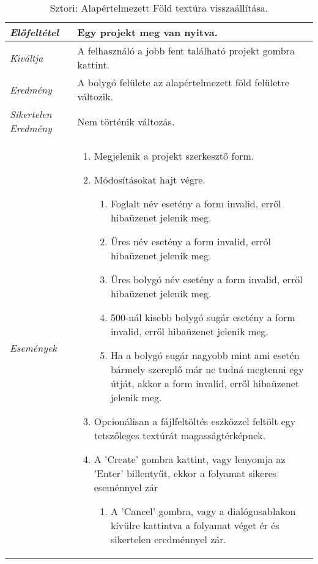 \begin{table}[H]
	\centering
	\begin{tabular}{ | m{} | m{} | }
		\hline
		\emph{Előfeltétel} & Egy projekt meg van nyitva.  \\
		\hline
		\emph{Kiváltja} & A felhasználó a jobb fent található projekt gombra kattint. \\
		\hline
		\emph{Eredmény} & A bolygó felülete az alapértelmezett föld felületre változik. \\
		\hline
		\emph{Sikertelen Eredmény} & Nem történik változás.  \\
		\hline
		\hline
		\emph{Események} &

		\begin{enumerate}[itemsep=-1ex]
			\item Megjelenik a projekt szerkesztő form.
			\item Módosításokat hajt végre.
			\begin{enumerate}[itemsep=-1ex]
				\item Foglalt név esetény a form invalid, erről hibaüzenet jelenik meg.
				\item Üres név esetény a form invalid, erről hibaüzenet jelenik meg.
				\item Üres bolygó név esetény a form invalid, erről hibaüzenet jelenik meg.
				\item 500-nál kisebb bolygó sugár esetény a form invalid, erről hibaüzenet jelenik meg.
				\item Ha a bolygó sugár nagyobb mint ami esetén bármely szereplő már ne tudná megtenni egy útját, akkor a form invalid, erről hibaüzenet jelenik meg.
			\end{enumerate}
			\item Opcionálisan a fájlfeltöltés eszközzel feltölt egy tetszőleges textúrát magasságtérképnek.
			\item A 'Create' gombra kattint, vagy lenyomja az 'Enter' billentyűt, ekkor a folyamat sikeres eseménnyel zár
			\begin{enumerate}[itemsep=-1ex]
				\item A 'Cancel' gombra, vagy a dialógusablakon kívülre kattintva a folyamat véget ér és sikertelen eredménnyel zár.
			\end{enumerate}
		\end{enumerate}

		\\
		\hline
	\end{tabular}
	\caption{Sztori: Alapértelmezett Föld textúra visszaállítása.}
	\label{tab:story-project-edit-earth-texture}
\end{table}

